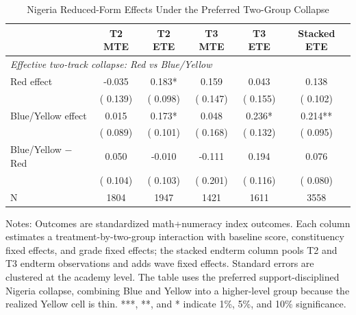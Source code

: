 \begin{table}[!htbp]
\centering
\caption{Nigeria Reduced-Form Effects Under the Preferred Two-Group Collapse}
\label{tab:ng_two_group}
\begin{threeparttable}
\footnotesize
\begin{tabular}[t]{lccccc}
\toprule
 & T2 MTE & T2 ETE & T3 MTE & T3 ETE & Stacked ETE \\
\midrule
\multicolumn{6}{l}{\textit{Effective two-track collapse: Red vs Blue/Yellow}} \\
Red effect &  -0.035 &   0.183* &   0.159 &   0.043 &   0.138 \\
 & (  0.139) & (  0.098) & (  0.147) & (  0.155) & (  0.102) \\
Blue/Yellow effect &   0.015 &   0.173* &   0.048 &   0.236* &   0.214** \\
 & (  0.089) & (  0.101) & (  0.168) & (  0.132) & (  0.095) \\
Blue/Yellow $-$ Red &   0.050 &  -0.010 &  -0.111 &   0.194 &   0.076 \\
 & (  0.104) & (  0.103) & (  0.201) & (  0.116) & (  0.080) \\
\addlinespace
N & 1804 & 1947 & 1421 & 1611 & 3558 \\
\bottomrule
\end{tabular}
\begin{tablenotes}
\footnotesize
\item Notes: Outcomes are standardized math+numeracy index outcomes. Each column estimates a treatment-by-two-group interaction with baseline score, constituency fixed effects, and grade fixed effects; the stacked endterm column pools T2 and T3 endterm observations and adds wave fixed effects. Standard errors are clustered at the academy level. The table uses the preferred support-disciplined Nigeria collapse, combining Blue and Yellow into a higher-level group because the realized Yellow cell is thin. ***, **, and * indicate 1\%, 5\%, and 10\% significance.
\end{tablenotes}
\end{threeparttable}
\end{table}
